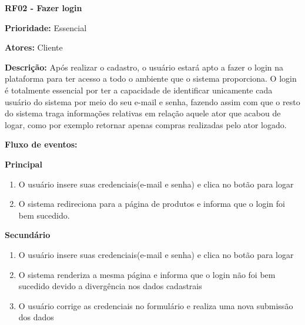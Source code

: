 \textbf{RF02 - Fazer login} \par
\textbf{Prioridade:} Essencial \par
\textbf{Atores:} Cliente \par
\textbf{Descrição:} Após realizar o cadastro, o usuário estará apto a fazer o login na plataforma para ter acesso a todo o ambiente que o sistema proporciona. O login é totalmente essencial por ter a capacidade de identificar unicamente cada usuário do sistema por meio do seu e-mail e senha, fazendo assim com que o resto do sistema traga informações relativas em relação aquele ator que acabou de logar, como por exemplo retornar apenas compras realizadas pelo ator logado. \par
\textbf{Fluxo de eventos:} \par
\textbf{Principal} \par
\begin{enumerate}
  \item O usuário insere suas credenciais(e-mail e senha) e clica no botão para logar
  \item O sistema redireciona para a página de produtos e informa que o login foi bem sucedido.
\end{enumerate}

\textbf{Secundário}

\begin{enumerate}
  \item O usuário insere suas credenciais(e-mail e senha) e clica no botão para logar
  
  \item O sistema renderiza a mesma página e informa que o login não foi bem sucedido devido a divergência nos dados cadastrais
  
  \item O usuário corrige as credenciais no formulário e realiza uma nova submissão dos dados

\end{enumerate}

